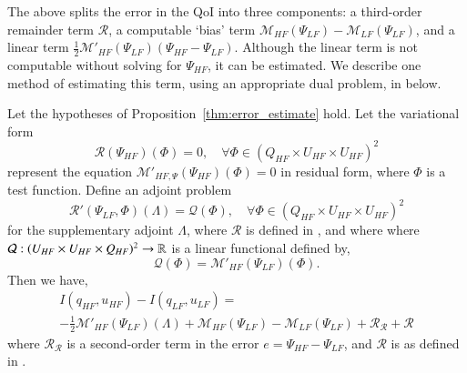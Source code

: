 The above  splits the error in the QoI into three components: a third-order remainder term $\mathcal{R}$, a computable `bias' term $\mathcal{M}_{HF}(\Psi_{LF})-\mathcal{M}_{LF}(\Psi_{LF})$, and a linear term $\frac{1}{2}\mathcal{M}'_{HF}(\Psi_{LF})(\Psi_{HF}-\Psi_{LF})$. Although the linear term is not computable without solving for $\Psi_{HF}$, it can be estimated. We describe one method of estimating this term, using an appropriate dual problem, in  below.

%
\begin{proposition}
\label{thm:error_estimate_dual}
Let the hypotheses of Proposition~\ref{thm:error_estimate} hold. Let the variational form
%
\begin{equation}
\mathscr{R}(\Psi_{HF})(\Phi)=0,\quad\forall\Phi\in(Q_{HF}\times U_{HF}\times U_{HF})^2
\label{eq:supadjsys_prop}
\end{equation}
%
represent the equation $\mathcal{M}'_{HF,\Psi}(\Psi_{HF})(\Phi)=0$ in residual form, where $\Phi$ is a test function. Define an adjoint problem
%
\begin{equation}
\mathscr{R}'(\Psi_{LF},\Phi)(\Lambda)=\mathcal{Q}(\Phi),\quad\forall\Phi\in(Q_{HF}\times U_{HF}\times U_{HF})^2
\label{eq:superAdjEq}
\end{equation}
for the supplementary adjoint $\Lambda$, where $\mathscr{R}$ is defined in , and where
%
%
where $\mathcal{Q}:(U_{HF} \times U_{HF} \times Q_{HF})^2 \to {\mathbb{R}}$ is a linear functional defined by,
%
\begin{equation}
\mathcal{Q}(\Phi)=\mathcal{M}'_{HF}(\Psi_{LF})(\Phi).
\label{eq:supadjout}
\end{equation}
%
Then we have,
%
\begin{multline}
\label{eq:finErrExp}
I(q_{HF},u_{HF})-I(q_{LF},u_{LF})=\\-\frac{1}{2}\mathcal{M}'_{HF}(\Psi_{LF})(\Lambda)+\mathcal M_{HF}(\Psi_{LF})-\mathcal M_{LF}(\Psi_{LF}) + \mathcal{R}_{\mathscr{R}} + \mathcal{R}
\end{multline}
%
where $\mathcal{R}_{\mathscr{R}}$ is a second-order term in the error $e=\Psi_{HF}-\Psi_{LF}$, and $\mathcal{R}$ is as defined in . %
%
\end{proposition}
